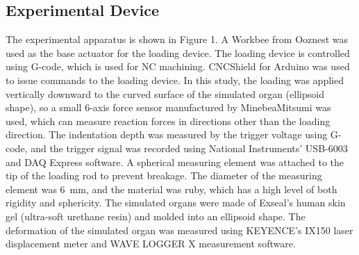 \subsection*{Experimental Device}
The experimental apparatus is shown in Figure 1. A %
Workbee from Ooznest was used as the base actuator for the loading device. The loading device is controlled using G-code, which is used for NC machining. CNCShield for Arduino was used to issue commands to the loading device. In this study, the loading was applied vertically downward to the curved surface of the simulated organ (ellipsoid shape), so a small 6-axis force sensor manufactured by MinebeaMitsumi was used, which can measure reaction forces in directions other than the loading direction. The indentation depth was measured by the trigger voltage using G-code, and the trigger signal was recorded using National Instruments' USB-6003 and DAQ Express software. A spherical measuring element was attached to the tip of the loading rod to prevent breakage. The diameter of the measuring element was \SI{6}{\milli \meter}, and the material was ruby, which has a high level of both rigidity and sphericity. The simulated organs were made of Exseal's human skin gel (ultra-soft urethane resin) and molded into an ellipsoid shape. The deformation of the simulated organ was measured using KEYENCE's IX150 laser displacement meter and WAVE LOGGER X measurement software.

